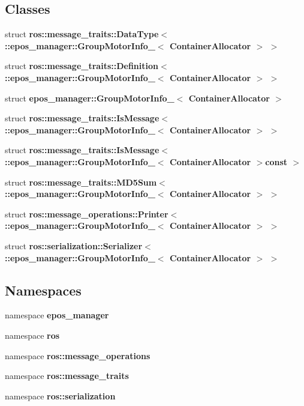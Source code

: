 \subsection*{\-Classes}
\begin{DoxyCompactItemize}
\item 
struct {\bf ros\-::message\-\_\-traits\-::\-Data\-Type$<$ \-::epos\-\_\-manager\-::\-Group\-Motor\-Info\-\_\-$<$ Container\-Allocator $>$ $>$}
\item 
struct {\bf ros\-::message\-\_\-traits\-::\-Definition$<$ \-::epos\-\_\-manager\-::\-Group\-Motor\-Info\-\_\-$<$ Container\-Allocator $>$ $>$}
\item 
struct {\bf epos\-\_\-manager\-::\-Group\-Motor\-Info\-\_\-$<$ Container\-Allocator $>$}
\item 
struct {\bf ros\-::message\-\_\-traits\-::\-Is\-Message$<$ \-::epos\-\_\-manager\-::\-Group\-Motor\-Info\-\_\-$<$ Container\-Allocator $>$ $>$}
\item 
struct {\bf ros\-::message\-\_\-traits\-::\-Is\-Message$<$ \-::epos\-\_\-manager\-::\-Group\-Motor\-Info\-\_\-$<$ Container\-Allocator $>$const  $>$}
\item 
struct {\bf ros\-::message\-\_\-traits\-::\-M\-D5\-Sum$<$ \-::epos\-\_\-manager\-::\-Group\-Motor\-Info\-\_\-$<$ Container\-Allocator $>$ $>$}
\item 
struct {\bf ros\-::message\-\_\-operations\-::\-Printer$<$ \-::epos\-\_\-manager\-::\-Group\-Motor\-Info\-\_\-$<$ Container\-Allocator $>$ $>$}
\item 
struct {\bf ros\-::serialization\-::\-Serializer$<$ \-::epos\-\_\-manager\-::\-Group\-Motor\-Info\-\_\-$<$ Container\-Allocator $>$ $>$}
\end{DoxyCompactItemize}
\subsection*{\-Namespaces}
\begin{DoxyCompactItemize}
\item 
namespace {\bf epos\-\_\-manager}
\item 
namespace {\bf ros}
\item 
namespace {\bf ros\-::message\-\_\-operations}
\item 
namespace {\bf ros\-::message\-\_\-traits}
\item 
namespace {\bf ros\-::serialization}
\end{DoxyCompactItemize}
